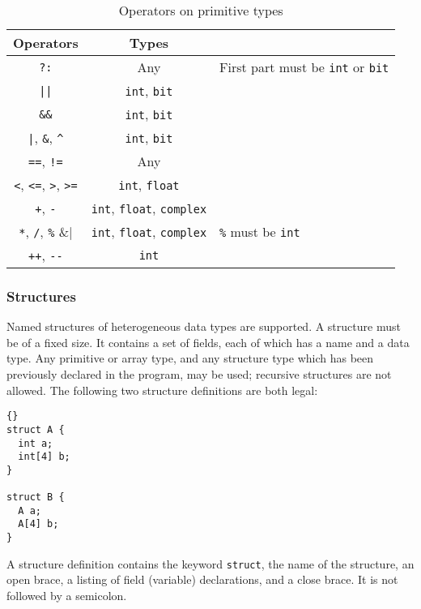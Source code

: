 \documentclass[11pt]{article}
\begin{document}
\begin{table}
\begin{center}
\begin{tabular}{ccl}
\toprule
\textbf{Operators} & \textbf{Types} \\
\midrule
\lstinline|?:| & Any & First part must be \lstinline|int| or \lstinline|bit| \\
\lstinline/||/ & \lstinline|int|, \lstinline|bit| \\
\lstinline|&&| & \lstinline|int|, \lstinline|bit| \\
\lstinline/|/, \lstinline|&|, \lstinline|^| &
  \lstinline|int|, \lstinline|bit| \\
\lstinline|==|, \lstinline|!=| & Any \\
\lstinline|<|, \lstinline|<=|, \lstinline|>|, \lstinline|>=| &
  \lstinline|int|, \lstinline|float| \\
\lstinline|+|, \lstinline|-| &
  \lstinline|int|, \lstinline|float|, \lstinline|complex| \\
\lstinline|*|, \lstinline|/|, \lstinline|%| &
  \lstinline|int|, \lstinline|float|, \lstinline|complex| &
  \lstinline|%| must be \lstinline|int| \\
\lstinline|++|, \lstinline|--| & \lstinline|int| \\
\bottomrule
\end{tabular}
\end{center}
\caption{Operators on primitive types}
\label{tab:primitive-operators}
\end{table}

\subsubsection{Structures}
\label{sec:data-structures}

Named structures of heterogeneous data types are supported.  A
structure must be of a fixed size.  It contains a set of fields, each
of which has a name and a data type.  Any primitive or array type, and
any structure type which has been previously declared in the program,
may be used; recursive structures are not allowed.  The following two
structure definitions are both legal:

\begin{lstlisting}{}
struct A {
  int a;
  int[4] b;
}

struct B {
  A a;
  A[4] b;
}
\end{lstlisting}

A structure definition contains the keyword \lstinline|struct|, the name
of the structure, an open brace, a listing of field (variable)
declarations, and a close brace.  It is not followed by a semicolon.
\end{document}
